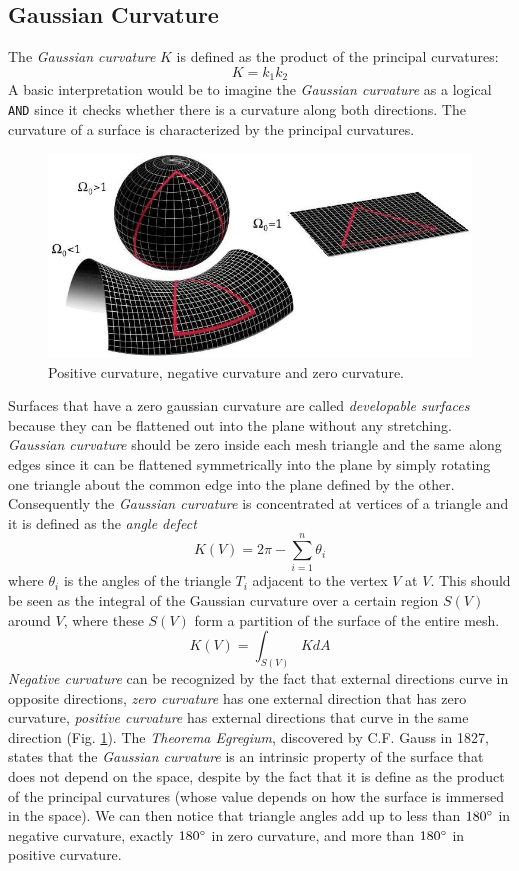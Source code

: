 \subsection{Gaussian Curvature} \label{section:gaussian-curvature-intro}
The \textit{Gaussian curvature} $K$ is defined as the product of the principal curvatures:
$$K=k_1k_2$$
A basic interpretation would be to imagine the \textit{Gaussian curvature} as a logical \texttt{AND} since it checks whether there is a curvature along both directions.
The curvature of a surface is characterized by the principal curvatures.
\cite{WEBSITE:gaussiancurvaturedirty}
\begin{figure}[!h]
  \centering
\includegraphics[scale=0.5]{images/gaussian_curvature_examples.png}
\caption{Positive curvature, negative curvature and zero curvature.}\label{fig:curvature-gaussian}
\end{figure}
Surfaces that have a zero gaussian curvature are called \textit{developable surfaces} because they can be flattened out into the plane without any stretching. \textit{Gaussian curvature} should be zero inside each mesh triangle and the same along edges since it can be flattened symmetrically into the plane by simply rotating one triangle about the common edge into the plane defined by the other. Consequently the \textit{Gaussian curvature} is concentrated at vertices of a triangle and it is defined as the \textit{angle defect}
$$K(V) = 2 \pi - \sum_{i=1}^n \theta_i$$
where $\theta_i$ is the angles of the triangle $T_i$ adjacent to the vertex $V$ at $V$. This should be seen as the integral of the Gaussian curvature over a certain region $S(V)$ around $V$, where these $S(V)$ form a partition of the surface of the entire mesh.
$$ K(V) = \int_{S(V)} KdA  $$
\textit{Negative curvature} can be recognized by the fact that external directions curve in opposite directions, \textit{zero curvature} has one external direction that has zero curvature, \textit{positive curvature} has external directions that curve in the same direction (Fig. \ref{fig:curvature-gaussian}).
The \textit{Theorema Egregium}, discovered by C.F. Gauss in 1827, states that the \textit{Gaussian curvature} is an intrinsic property of the surface that does not depend on the space, despite by the fact that it is define as the product of the principal curvatures (whose value depends on how the surface is immersed in the space).
We can then notice that triangle angles add up to less than $180 \degree$ in negative curvature, exactly $180 \degree$ in zero curvature, and more than $180 \degree$ in positive curvature.
\cite{geometryprocessing}

